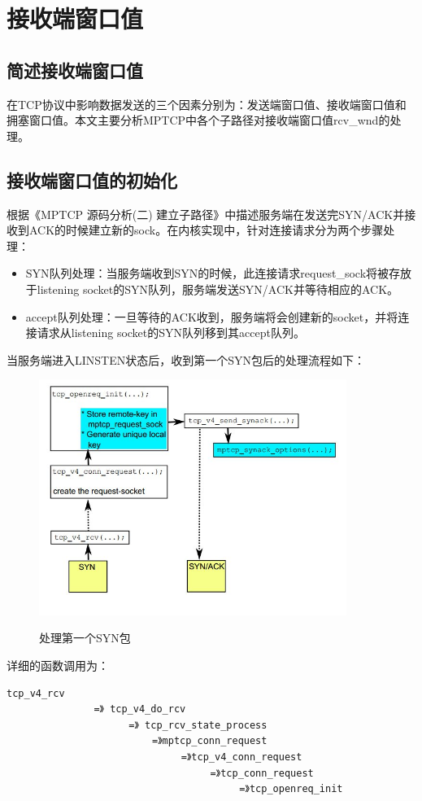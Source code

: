 \section{接收端窗口值}
\subsection{简述接收端窗口值}
在TCP协议中影响数据发送的三个因素分别为：发送端窗口值、接收端窗口值和拥塞窗口值。本文主要分析MPTCP中各个子路径对接收端窗口值rcv\_wnd的处理。
\subsection{接收端窗口值的初始化}
根据《MPTCP 源码分析(二) 建立子路径》中描述服务端在发送完SYN/ACK并接收到ACK的时候建立新的sock。在内核实现中，针对连接请求分为两个步骤处理：
\begin{itemize}
  \item SYN队列处理：当服务端收到SYN的时候，此连接请求request\_sock将被存放于listening socket的SYN队列，服务端发送SYN/ACK并等待相应的ACK。
  \item accept队列处理：一旦等待的ACK收到，服务端将会创建新的socket，并将连接请求从listening socket的SYN队列移到其accept队列。
\end{itemize}
当服务端进入LINSTEN状态后，收到第一个SYN包后的处理流程如下：
\begin{figure}[H]
  \centering
  \includegraphics[width=10cm]{dias/Handle-first-SYN.jpg}\\
  \caption{处理第一个SYN包}
\end{figure}
详细的函数调用为：
\small\begin{verbatim}
tcp_v4_rcv
               =》 tcp_v4_do_rcv
                     =》 tcp_rcv_state_process
                         =》mptcp_conn_request
                              =》tcp_v4_conn_request
                                   =》tcp_conn_request
                                        =》tcp_openreq_init
\end{verbatim}\normalsize
